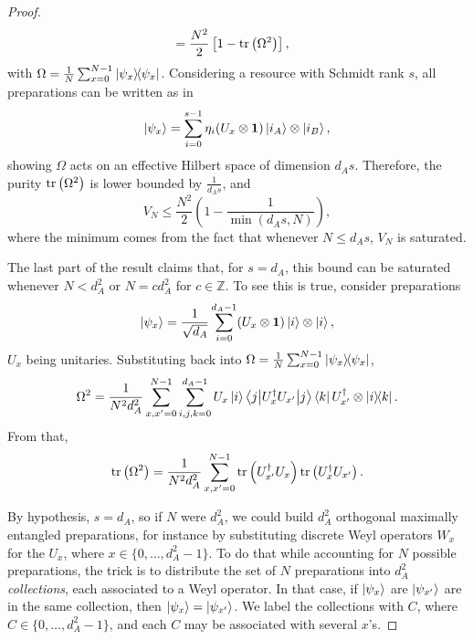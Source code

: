 \begin{proof}
\begin{align*}
            &= \frac{N^2}{2} \left[ 1 - \text{tr}\left( \Omega^2 \right) \right] ,
        \end{align*}
        with $\Omega = \frac{1}{N} \sum_{x=0}^{N-1} \ketbra{\psi_x}{\psi_x}$. Considering a resource with Schmidt rank $s$, all preparations can be written as in
        $$
            \ket{\psi_x} = \sum_{i = 0}^{s - 1} \eta_i (U_x \otimes \mathbf{1}) \ket{i_A} \otimes \ket{i_B} ,
        $$
        showing $\Omega$ acts on an effective Hilbert space of dimension $d_A s$. Therefore, the purity $\text{tr}\left( \Omega^2 \right)$ is lower bounded by $\frac{1}{d_A s}$, and
        $$
            V_N \leq \frac{N^2}{2} \left( 1 - \frac{1}{\min(d_A s, N)} \right) ,
        $$
		where the minimum comes from the fact that whenever $N \leq d_A s$, $V_N$ is saturated.

        The last part of the result claims that, for $s=d_A$, this bound can be saturated whenever $N < d_A^2$ or $N = c d_A^2$ for $c \in \mathbb{Z}$. To see this is true, consider preparations
        $$
            \ket{\psi_x} = \frac{1}{\sqrt{d_A}} \sum_{i=0}^{d_A - 1} (U_x \otimes \mathbf{1}) \ket{i} \otimes \ket{i} ,
        $$
        $U_x$ being unitaries. Substituting back into $\Omega = \frac{1}{N} \sum_{x=0}^{N-1} \ketbra{\psi_x}{\psi_x}$,
        $$
            \Omega^2 = \frac{1}{N^2 d_A^2} \sum_{x, x^\prime = 0}^{N - 1} \sum_{i, j, k = 0}^{d_A - 1} U_x \ket{i} \left\langle j \middle\vert U_x^\dagger U_{x^\prime} \middle\vert j \right\rangle \bra{k} U_{x^\prime}^\dagger \otimes \ketbra{i}{k} .
        $$
        From that,
        $$
            \text{tr}\left( \Omega^2 \right) = \frac{1}{N^2 d_A^2} \sum_{x, x^\prime = 0}^{N-1} \text{tr}\left( U_{x^\prime}^\dagger U_x \right) \text{tr}\left( U_{x}^\dagger U_{x^\prime} \right) .
        $$

        By hypothesis, $s=d_A$, so if $N$ were $d_A^2$, we could build $d_A^2$ orthogonal maximally entangled preparations, for instance by substituting discrete Weyl operators $W_x$ for the $U_x$, where $x \in \{0, \ldots, d_A^2 - 1 \}$. To do that while accounting for $N$ possible preparations, the trick is to distribute the set of $N$ preparations into $d_A^2$ \emph{collections}, each associated to a Weyl operator. In that case, if $\ket{\psi_x}$ are $\ket{\psi_{x^\prime}}$ are in the same collection, then $\ket{\psi_x} = \ket{\psi_{x^\prime}}$. We label the collections with $C$, where $C \in \{0, \ldots, d_A^2 -1 \}$, and each $C$ may be associated with several $x$'s.
        

\end{proof}

